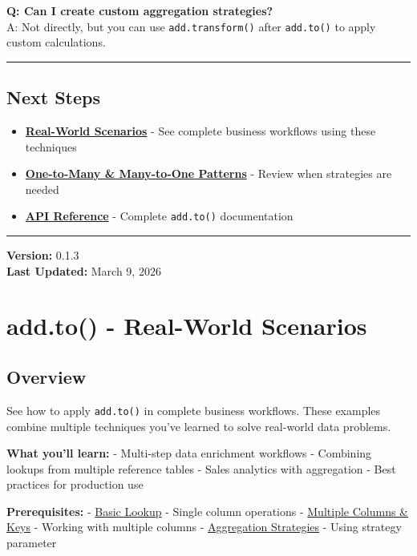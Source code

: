 \documentclass[
  letterpaper,
]{scrbook}
\providecommand{\tightlist}{%
  \setlength{\itemsep}{0pt}\setlength{\parskip}{0pt}}
\begin{document}
\textbf{Q: Can I create custom aggregation strategies?}\\
A: Not directly, but you can use \texttt{add.transform()} after
\texttt{add.to()} to apply custom calculations.

\begin{center}\rule{0.5\linewidth}{0.5pt}\end{center}

\section{Next Steps}\label{next-steps-5}

\begin{itemize}
\tightlist
\item
  \textbf{\href{examples-to-05-real-world.html}{Real-World Scenarios}} -
  See complete business workflows using these techniques
\item
  \textbf{\href{examples-to-03-patterns.html}{One-to-Many \& Many-to-One
  Patterns}} - Review when strategies are needed
\item
  \textbf{\href{reference-to-basic.html}{API Reference}} - Complete
  \texttt{add.to()} documentation
\end{itemize}

\begin{center}\rule{0.5\linewidth}{0.5pt}\end{center}

\textbf{Version:} 0.1.3\\
\textbf{Last Updated:} March 9, 2026

\chapter{add.to() - Real-World
Scenarios}\label{add.to---real-world-scenarios}

\section{Overview}\label{overview-4}

See how to apply \texttt{add.to()} in complete business workflows. These
examples combine multiple techniques you've learned to solve real-world
data problems.

\textbf{What you'll learn:} - Multi-step data enrichment workflows -
Combining lookups from multiple reference tables - Sales analytics with
aggregation - Best practices for production use

\textbf{Prerequisites:} - \href{examples-to-01-basic.html}{Basic Lookup}
- Single column operations -
\href{examples-to-02-multiple.html}{Multiple Columns \& Keys} - Working
with multiple columns - \href{examples-to-04-strategy.html}{Aggregation
Strategies} - Using strategy parameter
\end{document}
